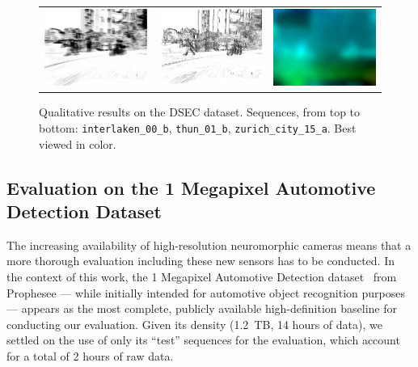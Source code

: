 \begin{figure}
\begin{tabular}{@{}ccc@{}}
    \includegraphics[width=0.3\linewidth]{mainmatter/figures/3_optical_flow/results_dsec/zurich_city_15_a_uncomp_468.png} &
    \includegraphics[width=0.3\linewidth]{mainmatter/figures/3_optical_flow/results_dsec/zurich_city_15_a_warped_468.png} &
    \includegraphics[width=0.3\linewidth]{mainmatter/figures/3_optical_flow/results_dsec/zurich_city_15_a_of_468.png}
  \end{tabular}
  \cprotect\caption{Qualitative results on the DSEC dataset. Sequences, from top to bottom: \verb|interlaken_00_b|, \verb|thun_01_b|, \verb|zurich_city_15_a|. Best viewed in color.}\label{fig:ebof:results_dsec}
\end{figure}

\subsection{Evaluation on the 1 Megapixel Automotive Detection Dataset}\label{sec:ebof:eval_prophesee1mp}
The increasing availability of high-resolution neuromorphic cameras means that a more thorough evaluation including these new sensors has to be conducted. In the context of this work, the 1 Megapixel Automotive Detection dataset~\cite{Perot2020LearningTD} from Prophesee --- while initially intended for automotive object recognition purposes --- appears as the most complete, publicly available high-definition baseline for conducting our evaluation. Given its density (1.2~TB, 14 hours of data), we settled on the use of only its ``test'' sequences for the evaluation, which account for a total of 2 hours of raw data.

